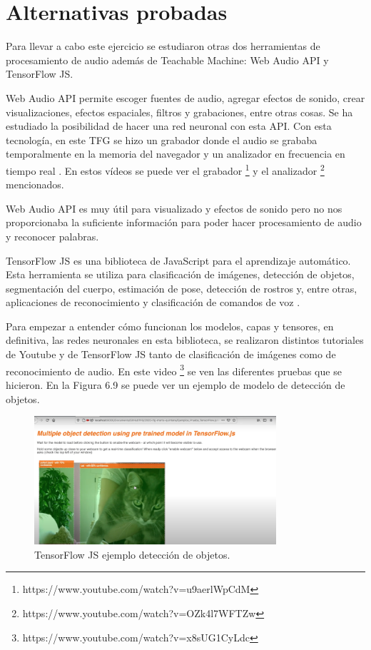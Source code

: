 \section{Alternativas probadas}

Para llevar a cabo este ejercicio se estudiaron otras dos herramientas de procesamiento de audio además de Teachable Machine: Web Audio API y TensorFlow JS.

Web Audio API permite escoger fuentes de audio, agregar efectos de sonido, crear visualizaciones, efectos espaciales, filtros y grabaciones, entre otras cosas.
Se ha estudiado la  posibilidad de hacer una red neuronal con esta API. Con esta tecnología, en este TFG se hizo un grabador donde el audio se grababa temporalmente en la memoria del navegador y un analizador en frecuencia en tiempo real \cite{waa} .  En estos vídeos se puede ver el grabador \footnote{https://www.youtube.com/watch?v=u9aerlWpCdM} y el analizador \footnote{https://www.youtube.com/watch?v=OZk4l7WFTZw} mencionados.

Web Audio API es muy útil para visualizado y efectos de sonido pero no nos proporcionaba la suficiente información para poder hacer procesamiento de audio y reconocer palabras.

TensorFlow JS es una biblioteca de JavaScript para el aprendizaje automático. Esta herramienta se utiliza para clasificación de imágenes, detección de objetos, segmentación del cuerpo, estimación de pose, detección de rostros y, entre otras, aplicaciones de reconocimiento y clasificación de comandos de voz \cite{tensorflowmodel}.

Para empezar a entender cómo funcionan los modelos, capas y  tensores, en definitiva,  las redes neuronales en esta biblioteca, se realizaron distintos tutoriales de Youtube y de TensorFlow JS tanto de clasificación de imágenes como de reconocimiento de audio. En este video \footnote{https://www.youtube.com/watch?v=x8sUG1CyLdc} se ven las diferentes pruebas que se hicieron. En la Figura 6.9 se puede ver un ejemplo de modelo de detección de objetos.

\begin{figure}[H]
    \centering
    \includegraphics[width=0.8\textwidth, height=0.4\textwidth]{chapters/images/imagerecognition.png}
    \caption{TensorFlow JS ejemplo detección de objetos. }
    \label{fig:my_label}
\end{figure}

